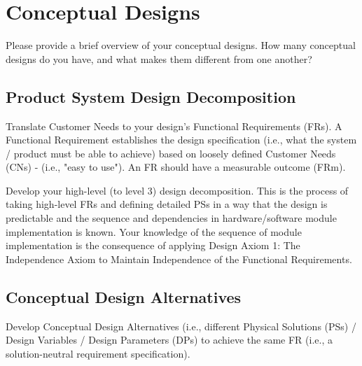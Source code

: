 \documentclass{ipfwpaper}
\begin{document}
\clearpage
\section{Conceptual Designs}
Please provide a brief overview of your conceptual designs. How many conceptual designs do you have, and what makes them different from one another?



\subsection{Product System Design Decomposition}

Translate Customer Needs to your design’s Functional Requirements (FRs). 
A Functional Requirement establishes the design specification (i.e., what the system / product must be able to achieve) based on loosely defined Customer Needs (CNs) - (i.e., "easy to use").  
An FR should have a measurable outcome (FRm).

Develop your high-level (to level 3) design decomposition. 
This is the process of taking high-level FRs and defining detailed PSs in a way that the design is predictable and the sequence and dependencies in hardware/software module implementation is known. 
Your knowledge of the sequence of module implementation is the consequence of applying Design Axiom 1: The Independence Axiom to Maintain Independence of the Functional Requirements.



\subsection{Conceptual Design Alternatives}
Develop Conceptual Design Alternatives (i.e., different Physical Solutions (PSs) / Design Variables / Design Parameters (DPs) to achieve the same FR (i.e., a solution-neutral requirement specification).\\
\end{document}
